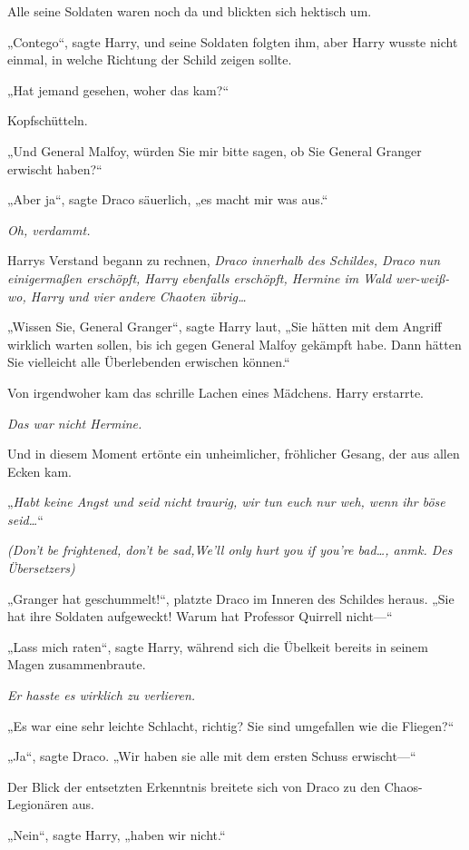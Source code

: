 {Alle seine Soldaten waren noch da und blickten sich hektisch um.

„Contego“, sagte Harry, und seine Soldaten folgten ihm, aber Harry wusste nicht einmal, in welche Richtung der Schild zeigen sollte.

„Hat jemand gesehen, woher das kam?“

Kopfschütteln.

„Und General Malfoy, würden Sie mir bitte sagen, ob Sie General Granger erwischt haben?“

„Aber ja“, sagte Draco säuerlich, „es macht mir was aus.“

\emph{Oh, verdammt.}

Harrys Verstand begann zu rechnen, \emph{Draco innerhalb des Schildes, Draco nun} \emph{einigermaßen erschöpft, Harry ebenfalls erschöpft, Hermine im Wald wer-weiß-wo, Harry und vier andere Chaoten übrig…}

„Wissen Sie, General Granger“, sagte Harry laut, „Sie hätten mit dem Angriff wirklich warten sollen, bis ich gegen General Malfoy gekämpft habe. Dann hätten Sie vielleicht alle Überlebenden erwischen können.“

Von irgendwoher kam das schrille Lachen eines Mädchens. Harry erstarrte.

\emph{Das war nicht Hermine.}

Und in diesem Moment ertönte ein unheimlicher, fröhlicher Gesang, der aus allen Ecken kam.

„\emph{Habt keine Angst und seid nicht traurig, wir tun euch nur weh, wenn ihr böse seid…}“

\emph{(Don't be frightened, don't be sad,We'll only hurt you if you're bad…, anmk. Des Übersetzers)}

„Granger hat geschummelt!“, platzte Draco im Inneren des Schildes heraus. „Sie hat ihre Soldaten aufgeweckt! Warum hat Professor Quirrell nicht—“

„Lass mich raten“, sagte Harry, während sich die Übelkeit bereits in seinem Magen zusammenbraute.

\emph{Er hasste es wirklich zu verlieren.}

„Es war eine sehr leichte Schlacht, richtig? Sie sind umgefallen wie die Fliegen?“

„Ja“, sagte Draco. „Wir haben sie alle mit dem ersten Schuss erwischt—“

Der Blick der entsetzten Erkenntnis breitete sich von Draco zu den Chaos-Legionären aus.

„Nein“, sagte Harry, „haben wir nicht.“

}
